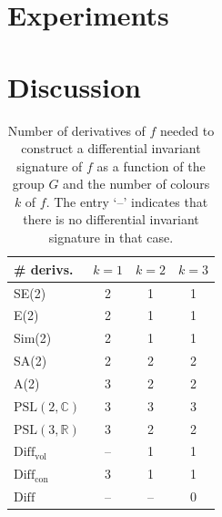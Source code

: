\documentclass[review,onefignum,onetabnum]{siamonline190516}
\def\R{\mathbb{R}}
\begin{document}


\section{Experiments}


\section{Discussion}

\begin{table}[h]
\begin{center}
\begin{tabular}{| l | c c c |}
\hline
\# derivs. & $k=1$ & $k=2$ & $k=3$ \\
\hline
SE(2) & 2 &1 & 1 \\
E(2) & 2 & 1 & 1 \\
Sim(2) & 2 & 1 & 1 \\
SA(2) & 2 & 2 & 2 \\
A(2) & 3 & 2 & 2 \\
$\mathrm{PSL}(2,\mathbb{C})$ & 3 & 3 & 3 \\
$\mathrm{PSL}(3,\R)$ & 3 & 2 & 2 \\
$\mathrm{Diff}_{\mathrm{vol}}$ & -- & 1 & 1 \\
$\mathrm{Diff}_{\mathrm{con}}$ & 3 & 1 & 1 \\
$\mathrm{Diff}$ & -- & -- & 0 \\
\hline
\end{tabular}
\caption{Number of derivatives of $f$ needed to construct a differential invariant signature of $f$ as a function of the group $G$ and the number of colours $k$ of $f$. The entry `--' indicates that there is no differential invariant signature in that case.}
\end{center}
\end{table}
\end{document}
